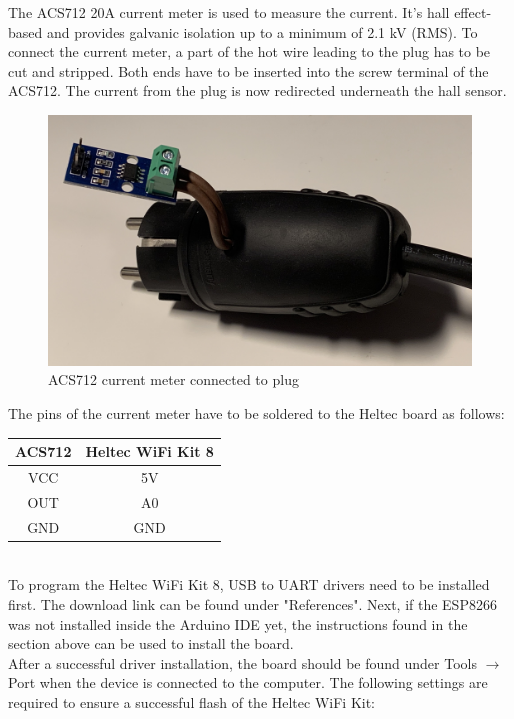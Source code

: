 The ACS712 20A current meter is used to measure the current.
It's hall effect-based and provides galvanic isolation up to a minimum of 2.1 kV (RMS)\cite{acs712}.
To connect the current meter, a part of the hot wire leading to the plug has to be cut and stripped.
Both ends have to be inserted into the screw terminal of the ACS712.
The current from the plug is now redirected underneath the hall sensor.
\\
\begin{figure}[H]
    \includegraphics[width=\textwidth]{img/acs712.jpg}
    \caption{ACS712 current meter connected to plug}
    \label{fig:acs712}
\end{figure}

The pins of the current meter have to be soldered to the Heltec board as follows:
\\
\begin{center}
    \begin{tabular} { |c|c| }
        \hline
        ACS712 & Heltec WiFi Kit 8 \\
        \hline\hline
        VCC & 5V \\
        \hline
        OUT & A0 \\
        \hline
        GND & GND \\
        \hline
    \end{tabular}
    \label{tab:currentmeter}
\end{center}
\leavevmode
\\
To program the Heltec WiFi Kit 8, USB to UART drivers need to be installed first.
The download link can be found under "References"\cite{vcp-drivers}.
Next, if the ESP8266 was not installed inside the Arduino IDE yet, the instructions found in the section above can be used to install the board.
\\
After a successful driver installation, the board should be found under Tools $\rightarrow$ Port when the device is connected to the computer.
\newpage
The following settings are required to ensure a successful flash of the Heltec WiFi Kit:

